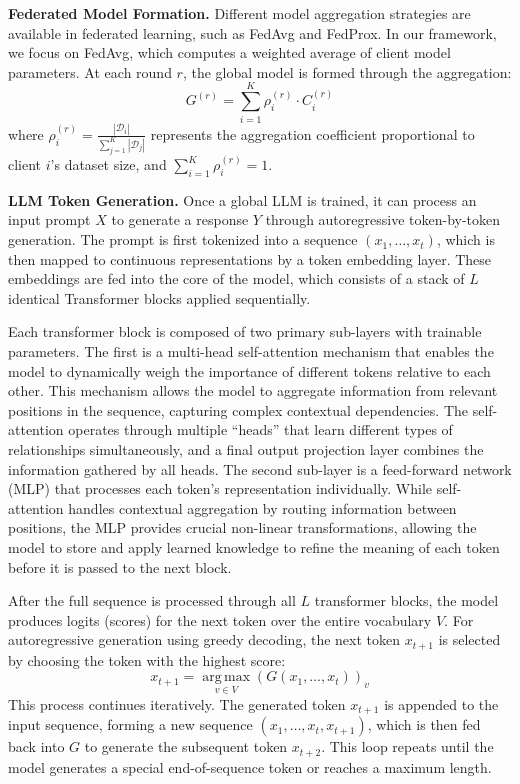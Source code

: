 \textbf{Federated Model Formation.} Different model aggregation strategies are available in federated learning, such as FedAvg and FedProx. In our framework, we focus on FedAvg, which computes a weighted average of client model parameters. At each round $r$, the global model is formed through the aggregation:
\begin{equation}
\label{eq:fedavg-aggregation}
G^{(r)} = \sum_{i=1}^K \rho_i^{(r)} \cdot C_i^{(r)}
\end{equation}
where $\rho_i^{(r)} = \frac{|\mathcal{D}_i|}{\sum_{j=1}^K |\mathcal{D}_j|}$ represents the aggregation coefficient proportional to client $i$'s dataset size, and $\sum_{i=1}^K \rho_i^{(r)} = 1$.

\textbf{LLM Token Generation.} Once a global LLM is trained, it can process an input prompt $X$ to generate a response $Y$ through autoregressive token-by-token generation. The prompt is first tokenized into a sequence $(x_1, \ldots, x_t)$, which is then mapped to continuous representations by a token embedding layer. These embeddings are fed into the core of the model, which consists of a stack of $L$ identical Transformer blocks applied sequentially.

Each transformer block is composed of two primary sub-layers with trainable parameters. The first is a multi-head self-attention mechanism that enables the model to dynamically weigh the importance of different tokens relative to each other. This mechanism allows the model to aggregate information from relevant positions in the sequence, capturing complex contextual dependencies. The self-attention operates through multiple ``heads'' that learn different types of relationships simultaneously, and a final output projection layer combines the information gathered by all heads. The second sub-layer is a feed-forward network (MLP) that processes each token's representation individually. While self-attention handles contextual aggregation by routing information between positions, the MLP provides crucial non-linear transformations, allowing the model to store and apply learned knowledge to refine the meaning of each token before it is passed to the next block.

After the full sequence is processed through all $L$ transformer blocks, the model produces logits (scores) for the next token over the entire vocabulary $V$. For autoregressive generation using greedy decoding, the next token $x_{t+1}$ is selected by choosing the token with the highest score:
\begin{equation}
\label{eq:token-generation}
x_{t+1} = \operatorname*{arg\,max}_{v \in V} \left( G(x_1, \ldots, x_t) \right)_v
\end{equation}
This process continues iteratively. The generated token $x_{t+1}$ is appended to the input sequence, forming a new sequence $(x_1, \ldots, x_t, x_{t+1})$, which is then fed back into $G$ to generate the subsequent token $x_{t+2}$. This loop repeats until the model generates a special end-of-sequence token or reaches a maximum length.

